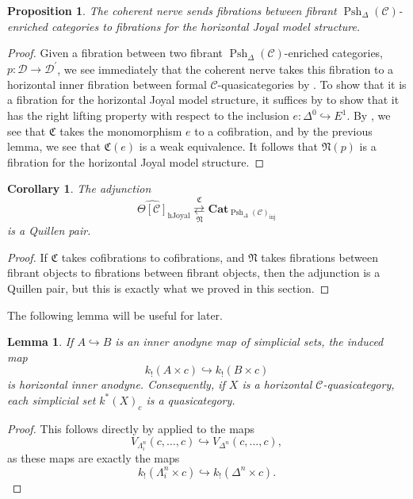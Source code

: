 \documentclass[leqno]{article}
\numberwithin{equation}{subsection}
\theoremstyle{plain}   %
\newtheorem{prop}[equation]{Proposition}
\newtheorem{cor}[equation]{Corollary}
\newtheorem{lemma}[equation]{Lemma}
\theoremstyle{remark}
\theoremstyle{plain}
\newcommand{\Cat}{\ensuremath{\mathbf{Cat}}}
\providecommand{\C}{}
\renewcommand{\C}{\ensuremath{\mathcal{C}}}
\newcommand{\cellset}{\ensuremath{\widehat{\Theta[\mathcal{C}]}}}
\newcommand{\spsh}{\ensuremath{\operatorname{Psh}_\Delta(\mathcal{C})}}
\begin{document}
\begin{prop}
	The coherent nerve sends fibrations between fibrant \(\spsh\)-enriched categories to fibrations for the horizontal Joyal model structure.
\end{prop}
\begin{proof}
	Given a fibration between two fibrant \(\spsh\)-enriched categories, \(p:\mathcal{D}\to \mathcal{D}^\prime\), we see immediately that the coherent nerve takes this fibration to a horizontal inner fibration between formal \(\C\)-quasicategories by .  To show that it is a fibration for the horizontal Joyal model structure, it suffices by  to show that it has the right lifting property with respect to the inclusion \(e:\Delta^0 \hookrightarrow E^1\). By , we see that \(\mathfrak{C}\) takes the monomorphism \(e\) to a cofibration, and by the previous lemma, we see that \(\mathfrak{C}(e)\) is a weak equivalence.  It follows that \(\mathfrak{N}(p)\) is a fibration for the horizontal Joyal model structure.
\end{proof}

\begin{cor}\label{horizquillen}
	The adjunction 
	\[\cellset_{\mathrm{hJoyal}} \underset{\mathfrak{N}}{\overset{\mathfrak{C}}{\rightleftarrows}} \Cat_{\spsh_{\mathrm{inj}}}\]
	is a Quillen pair.
\end{cor}
\begin{proof}
	If \(\mathfrak{C}\) takes cofibrations to cofibrations, and \(\mathfrak{N}\) takes fibrations between fibrant objects to fibrations between fibrant objects, then the adjunction is a Quillen pair, but this is exactly what we proved in this section.
\end{proof}

The following lemma will be useful for later.
\begin{lemma}\label{precatanodyne}
	If \(A\hookrightarrow B\) is an inner anodyne map of simplicial sets, the induced map
	\[k_!(A\times c) \hookrightarrow k_!(B\times c)\] is horizontal inner anodyne. Consequently, if \(X\) is a horizontal \(\C\)-quasicategory, each simplicial set \(k^\ast(X)_c\) is a quasicategory. 
\end{lemma}
\begin{proof}
	This follows directly by  applied to the maps
	\[V_{\Lambda^n_i}(c,\dots,c) \hookrightarrow V_{\Delta^n}(c,\dots,c),\] as these maps are exactly the maps
	\[k_!(\Lambda^n_i\times c) \hookrightarrow k_!(\Delta^n \times c).\]
\end{proof}
\end{document}
